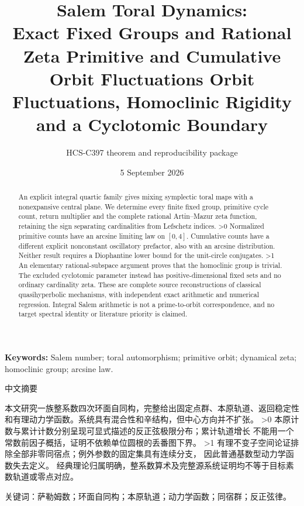 \documentclass[10pt]{article}
\title{Salem Toral Dynamics:\\
\ifcase\CRevisionRound Exact Fixed Groups and Rational Zeta
\or Primitive and Cumulative Orbit Fluctuations
\else Orbit Fluctuations, Homoclinic Rigidity and a Cyclotomic Boundary\fi}
\author{HCS-C397 theorem and reproducibility package}
\date{5 September 2026}
\begin{document}
\maketitle
\begin{abstract}
An explicit integral quartic family gives mixing symplectic toral maps with
a nonexpansive central plane. We determine every finite fixed group,
primitive cycle count, return multiplier and the complete rational
Artin--Mazur zeta function, retaining the sign separating cardinalities
from Lefschetz indices.
\ifnum\CRevisionRound>0
Normalized primitive counts have an arcsine limiting law on $[0,4]$.
Cumulative counts have a different explicit nonconstant oscillatory
prefactor, also with an arcsine distribution. Neither result requires a
Diophantine lower bound for the unit-circle conjugates.
\fi
\ifnum\CRevisionRound>1
An elementary rational-subspace argument proves that the homoclinic group
is trivial. The excluded cyclotomic parameter instead has positive-dimensional
fixed sets and no ordinary cardinality zeta.
\fi
These are complete source reconstructions of classical quasihyperbolic
mechanisms, with independent exact arithmetic and numerical regression.
Integral Salem arithmetic is not a prime-to-orbit correspondence, and
no target spectral identity or literature priority is claimed.
\end{abstract}
\noindent\textbf{Keywords:} Salem number; toral automorphism; primitive orbit; dynamical zeta; homoclinic group; arcsine law.
\begin{otherlanguage}{chinese-simplified}
\begin{center}{\large 中文摘要}\end{center}
\begin{sloppypar}
本文研究一族整系数四次环面自同构，完整给出固定点群、本原轨道、返回稳定性
和有理动力学函数。系统具有混合性和辛结构，但中心方向并不扩张。
\ifnum\CRevisionRound>0
本原计数与累计计数分别呈现可显式描述的反正弦极限分布；累计轨道增长
不能用一个常数前因子概括，证明不依赖单位圆根的丢番图下界。
\fi
\ifnum\CRevisionRound>1
有理不变子空间论证排除全部非零同宿点；例外参数的固定集具有连续分支，
因此普通基数型动力学函数失去定义。
\fi
经典理论归属明确，整系数算术及完整源系统证明均不等于目标素数轨道或零点对应。
\end{sloppypar}
\noindent 关键词：萨勒姆数；环面自同构；本原轨道；动力学函数；同宿群；反正弦律。
\end{otherlanguage}
\end{document}
